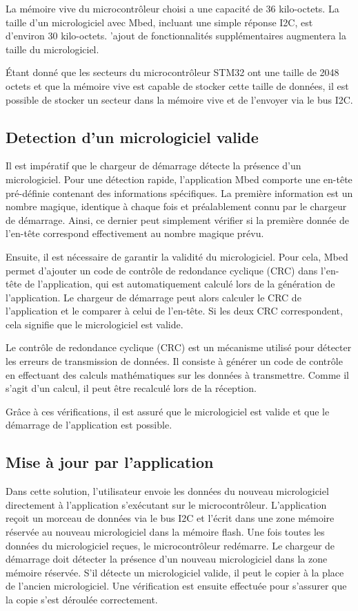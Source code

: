 La mémoire vive du microcontrôleur choisi a une capacité de 36 kilo-octets.
La taille d'un micrologiciel avec Mbed, incluant une simple réponse I2C, est d'environ 30 kilo-octets.
'ajout de fonctionnalités supplémentaires augmentera la taille du micrologiciel.

Étant donné que les secteurs du microcontrôleur STM32 ont une taille de 2048 octets et que la mémoire vive est capable de stocker cette taille de données, il est possible de stocker un secteur dans la mémoire vive et de l'envoyer via le bus I2C.

\subsection{Detection d'un micrologiciel valide}

Il est impératif que le chargeur de démarrage détecte la présence d'un micrologiciel.
Pour une détection rapide, l'application Mbed comporte une en-tête pré-définie contenant des informations spécifiques.
La première information est un nombre magique, identique à chaque fois et préalablement connu par le chargeur de démarrage.
Ainsi, ce dernier peut simplement vérifier si la première donnée de l'en-tête correspond effectivement au nombre magique prévu.

Ensuite, il est nécessaire de garantir la validité du micrologiciel.
Pour cela, Mbed permet d'ajouter un code de contrôle de redondance cyclique (CRC) dans l'en-tête de l'application, qui est automatiquement calculé lors de la génération de l'application.
Le chargeur de démarrage peut alors calculer le CRC de l'application et le comparer à celui de l'en-tête.
Si les deux CRC correspondent, cela signifie que le micrologiciel est valide.

Le contrôle de redondance cyclique (CRC) est un mécanisme utilisé pour détecter les erreurs de transmission de données.
Il consiste à générer un code de contrôle en effectuant des calculs mathématiques sur les données à transmettre.
Comme il s'agit d'un calcul, il peut être recalculé lors de la réception.

Grâce à ces vérifications, il est assuré que le micrologiciel est valide et que le démarrage de l'application est possible.

\subsection{Mise à jour par l'application}

Dans cette solution, l'utilisateur envoie les données du nouveau micrologiciel directement à l'application s'exécutant sur le microcontrôleur.
L'application reçoit un morceau de données via le bus I2C et l'écrit dans une zone mémoire réservée au nouveau micrologiciel dans la mémoire flash.
Une fois toutes les données du micrologiciel reçues, le microcontrôleur redémarre.
Le chargeur de démarrage doit détecter la présence d'un nouveau micrologiciel dans la zone mémoire réservée.
S'il détecte un micrologiciel valide, il peut le copier à la place de l'ancien micrologiciel.
Une vérification est ensuite effectuée pour s'assurer que la copie s'est déroulée correctement.

